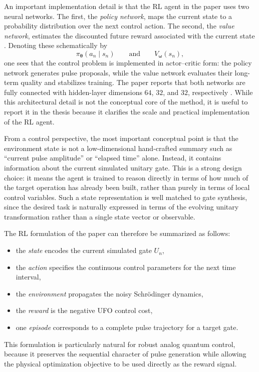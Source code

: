 An important implementation detail is that the RL agent in the paper uses two neural networks. The first, the \emph{policy network}, maps the current state to a probability distribution over the next control action. The second, the \emph{value network}, estimates the discounted future reward associated with the current state \cite{Niu2019}. Denoting these schematically by
\begin{equation}
\pi_{\bm{\theta}}(a_n\mid s_n)
\qquad \text{and} \qquad
V_{\bm{\omega}}(s_n),
\label{eq:paper_policy_value_networks}
\end{equation}
one sees that the control problem is implemented in actor--critic form: the policy network generates pulse proposals, while the value network evaluates their long-term quality and stabilizes training. The paper reports that both networks are fully connected with hidden-layer dimensions \(64\), \(32\), and \(32\), respectively \cite{Niu2019}. While this architectural detail is not the conceptual core of the method, it is useful to report it in the thesis because it clarifies the scale and practical implementation of the RL agent.

From a control perspective, the most important conceptual point is that the environment state is not a low-dimensional hand-crafted summary such as ``current pulse amplitude'' or ``elapsed time'' alone. Instead, it contains information about the current simulated unitary gate. This is a strong design choice: it means the agent is trained to reason directly in terms of how much of the target operation has already been built, rather than purely in terms of local control variables. Such a state representation is well matched to gate synthesis, since the desired task is naturally expressed in terms of the evolving unitary transformation rather than a single state vector or observable.


The RL formulation of the paper can therefore be summarized as follows:
\begin{itemize}
\item the \emph{state} encodes the current simulated gate \(U_n\),
\item the \emph{action} specifies the continuous control parameters for the next time interval,
\item the \emph{environment} propagates the noisy Schr\"odinger dynamics,
\item the \emph{reward} is the negative UFO control cost,
\item one \emph{episode} corresponds to a complete pulse trajectory for a target gate.
\end{itemize}
This formulation is particularly natural for robust analog quantum control, because it preserves the sequential character of pulse generation while allowing the physical optimization objective to be used directly as the reward signal.

